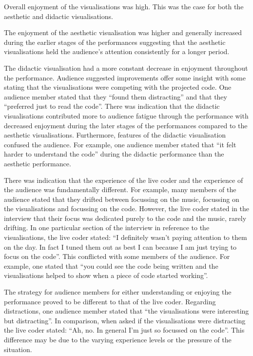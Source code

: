 \documentclass{sig-alternate}
\begin{document}
Overall enjoyment of the visualisations was high. This was the case for both the aesthetic and didactic visualisations.

The enjoyment of the aesthetic visualisation was higher and generally increased during the earlier stages of the performances suggesting that the aesthetic visualisations held the audience's attention consistently for a longer period.

The didactic visualisation had a more constant decrease in enjoyment throughout the performance. Audience suggested improvements offer some insight with some stating that the visualisations were competing with the projected code. One audience member stated that they ``found them distracting'' and that they ``preferred just to read the code''. There was indication that the didactic visualisations contributed more to audience fatigue through the performance with decreased enjoyment during the later stages of the performances compared to the aesthetic visualisations. Furthermore, features of the didactic visualisation confused the audience. For example, one audience member stated that ``it felt harder to understand the code'' during the didactic performance than the aesthetic performance.

There was indication that the experience of the live coder and the experience of the audience was fundamentally different. For example, many members of the audience stated that they drifted between focussing on the music, focussing on the visualisations and focussing on the code. However, the live coder stated in the interview that their focus was dedicated purely to the code and the music, rarely drifting. In one particular section of the interview in reference to the visualisations, the live coder stated: ``I definitely wasn't paying attention to them on the day. In fact I tuned them out as best I can because I am just trying to focus on the code''. This conflicted with some members of the audience. For example, one stated that ``you could see the code being written and the visualisations helped to show when a piece of code started working''. 

The strategy for audience members for either understanding or enjoying the performance proved to be different to that of the live coder. Regarding distractions, one audience member stated that ``the visualisations were interesting but distracting''. In comparison, when asked if the visualisations were distracting the live coder stated: ``Ah, no. In general I'm just so focussed on the code''. This difference may be due to the varying experience levels or the pressure of the situation.
\end{document}
